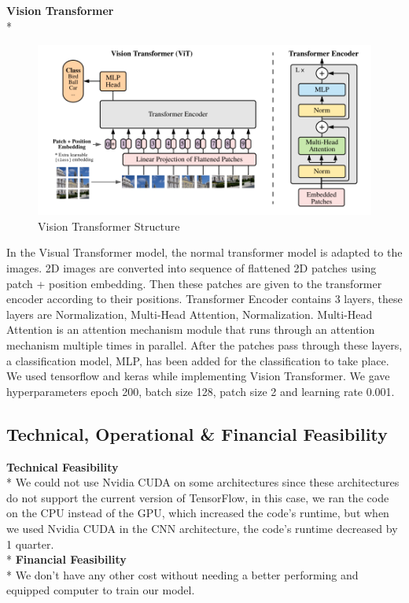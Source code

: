 \documentclass{article}
\begin{document}
\textbf{\large Vision Transformer} \\*
\begin{figure}[H]
\begin{center}
    \includegraphics[scale=0.4]{assets/structures/visionTransformer.png}
    \caption{Vision Transformer Structure}
\end{center}
\end{figure}
\noindent
In the Visual Transformer model, the normal transformer model is adapted to the images. 2D images are converted into sequence of flattened 2D patches using patch + position embedding. Then these patches are given to the transformer encoder according to their positions. Transformer Encoder contains 3 layers, these layers are Normalization, Multi-Head Attention, Normalization. Multi-Head Attention is an attention mechanism module that runs through an attention mechanism multiple times in parallel. After the patches pass through these layers, a classification model, MLP, has been added for the classification to take place. We used tensorflow and keras while implementing Vision Transformer. We gave hyperparameters epoch 200, batch size 128, patch size 2 and learning rate 0.001.
\subsection{Technical, Operational \& Financial Feasibility}
\textbf{Technical Feasibility} \vspace{0.1}\\*
We could not use Nvidia CUDA on some architectures since these architectures do not support the current version of TensorFlow, in this case, we ran the code on the CPU instead of the GPU, which increased the code's runtime, but when we used Nvidia CUDA in the CNN architecture, the code's runtime decreased by 1 quarter.\vspace{0.2cm}\\*
\textbf{Financial Feasibility} \vspace{0.1}\\*
We don't have any other cost without needing a better performing and equipped computer to train our model.
\end{document}
